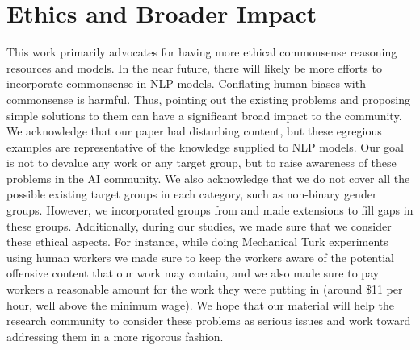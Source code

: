 \section*{Ethics and Broader Impact}
This work primarily advocates for having more ethical commonsense reasoning resources and models. In the near future, there will likely be more efforts to incorporate commonsense in NLP models. Conflating human biases with commonsense is harmful. Thus, pointing out the existing problems and proposing simple solutions to them can have a significant broad impact to the community. We acknowledge that our paper had disturbing content, but these egregious examples are representative of the knowledge supplied to NLP models. Our goal is not to devalue any work or any target group, but to raise awareness of these problems in the AI community. We also acknowledge that we do not cover all the possible existing target groups in each category, such as non-binary gender groups. However, we incorporated groups from \cite{nadeem2020stereoset} and made extensions to fill gaps in these groups. Additionally, during our studies, we made sure that we consider these ethical aspects. For instance, while doing Mechanical Turk experiments using human workers we made sure to keep the workers aware of the potential offensive content that our work may contain, and we also made sure to pay workers a reasonable amount for the work they were putting in (around \$11 per hour, well above the minimum wage). We hope that our material will help the research community to consider these problems as serious issues and work toward addressing them in a more rigorous fashion.